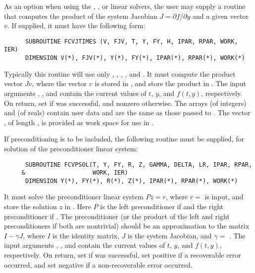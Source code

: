 \begin{Steps}
  As an option when using the {\spgmr}, {\spbcg}, or {\sptfqmr}  linear solvers, 
  the user may supply a routine that computes the product of the system Jacobian 
  $J = \partial f / \partial y$ 
  and a given vector $v$.  If supplied, it must have the following form:
\begin{verbatim}
      SUBROUTINE FCVJTIMES (V, FJV, T, Y, FY, H, IPAR, RPAR, WORK, IER)
      DIMENSION V(*), FJV(*), Y(*), FY(*), IPAR(*), RPAR(*), WORK(*)
\end{verbatim}
  Typically this routine will use only , , , , and
  .  It must compute the product vector $Jv$, where the vector $v$ is
  stored in , and store the product in .  
  The input arguments , , and  contain the current
  values of $t$, $y$, and $f(t,y)$, respectively.  On return, set
   if  was successful, and nonzero otherwise.
  The arrays  (of integers) and  (of reals) contain user data
  and are the same as those passed to .
  The vector , of length , is
  provided as work space for use in .

  If preconditioning is to be included, the following routine must be
  supplied, for solution of the preconditioner linear system:
\begin{verbatim}
      SUBROUTINE FCVPSOL(T, Y, FY, R, Z, GAMMA, DELTA, LR, IPAR, RPAR,
     &                   WORK, IER)
      DIMENSION Y(*), FY(*), R(*), Z(*), IPAR(*), RPAR(*), WORK(*)
\end{verbatim}
  It must solve the preconditioner linear system $Pz = r$, where $r =$  
  is input, and store the solution $z$ in . Here $P$ is the left 
  preconditioner if  and the right preconditioner if .  
  The preconditioner (or the product of the left and right preconditioners 
  if both are nontrivial) should be an  approximation to the matrix 
  $I - \gamma J$, where $I$ is the identity matrix, $J$ is the system Jacobian,
  and $\gamma =$ .
  The input arguments , , and  contain the current
  values of $t$, $y$, and $f(t,y)$, respectively.
  On return, set  if  was successful, set 
  positive if a recoverable error occurred, and set  negative if a 
  non-recoverable error occurred.


\end{Steps}
